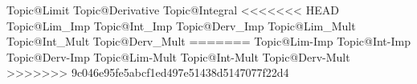 Topic@Limit	         		 %
Topic@Derivative            %
Topic@Integral 				 %
<<<<<<< HEAD
Topic@Lim_Imp				 %
Topic@Int_Imp				 %
Topic@Derv_Imp				 %
Topic@Lim_Mult				 %
Topic@Int_Mult				 %
Topic@Derv_Mult				 %
=======
Topic@Lim-Imp				 %
Topic@Int-Imp				 %
Topic@Derv-Imp				 %
Topic@Lim-Mult				 %
Topic@Int-Mult				 %
Topic@Derv-Mult				 %
>>>>>>> 9c046e95fe5abcf1ed497e51438d5147077f22d4



